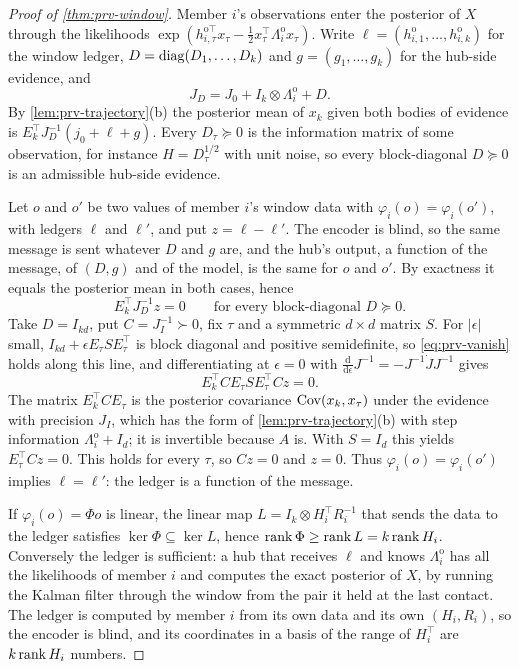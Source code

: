 \begin{proof}[Proof of \cref{thm:prv-window}]
Member $i$'s observations enter the posterior of $X$ through the likelihoods $\exp(h^{\mathrm o\top}_{i,\tau}x_\tau-\frac12x_\tau^\top\Lambda^{\mathrm o}_ix_\tau)$. Write $\ell=(h^{\mathrm o}_{i,1},\dots,h^{\mathrm o}_{i,k})$ for the window ledger, $D=\operatorname{diag}(D_1,\dots,D_k)$ and $g=(g_1,\dots,g_k)$ for the hub-side evidence, and
\[
J_D=J_0+I_k\otimes\Lambda^{\mathrm o}_i+D .
\]
By \cref{lem:prv-trajectory}(b) the posterior mean of $x_k$ given both bodies of evidence is $E_k^\top J_D^{-1}(j_0+\ell+g)$. Every $D_\tau\succeq0$ is the information matrix of some observation, for instance $H=D_\tau^{1/2}$ with unit noise, so every block-diagonal $D\succeq0$ is an admissible hub-side evidence.

Let $o$ and $o'$ be two values of member $i$'s window data with $\varphi_i(o)=\varphi_i(o')$, with ledgers $\ell$ and $\ell'$, and put $z=\ell-\ell'$. The encoder is blind, so the same message is sent whatever $D$ and $g$ are, and the hub's output, a function of the message, of $(D,g)$ and of the model, is the same for $o$ and $o'$. By exactness it equals the posterior mean in both cases, hence
\begin{equation}\label{eq:prv-vanish}
E_k^\top J_D^{-1}z=0\qquad\text{for every block-diagonal }D\succeq0 .
\end{equation}
Take $D=I_{kd}$, put $C=J_{I}^{-1}\succ0$, fix $\tau$ and a symmetric $d\times d$ matrix $S$. For $\lvert\epsilon\rvert$ small, $I_{kd}+\epsilon E_\tau SE_\tau^\top$ is block diagonal and positive semidefinite, so \eqref{eq:prv-vanish} holds along this line, and differentiating at $\epsilon=0$ with $\frac{\mathrm d}{\mathrm d\epsilon}J^{-1}=-J^{-1}\dot JJ^{-1}$ gives
\[
E_k^\top CE_\tau SE_\tau^\top Cz=0 .
\]
The matrix $E_k^\top CE_\tau$ is the posterior covariance $\operatorname{Cov}(x_k,x_\tau)$ under the evidence with precision $J_I$, which has the form of \cref{lem:prv-trajectory}(b) with step information $\Lambda^{\mathrm o}_i+I_d$; it is invertible because $A$ is. With $S=I_d$ this yields $E_\tau^\top Cz=0$. This holds for every $\tau$, so $Cz=0$ and $z=0$. Thus $\varphi_i(o)=\varphi_i(o')$ implies $\ell=\ell'$: the ledger is a function of the message.

If $\varphi_i(o)=\Phi o$ is linear, the linear map $L=I_k\otimes H_i^\top R_i^{-1}$ that sends the data to the ledger satisfies $\ker\Phi\subseteq\ker L$, hence $\operatorname{rank}\Phi\ge\operatorname{rank} L=k\operatorname{rank} H_i$. Conversely the ledger is sufficient: a hub that receives $\ell$ and knows $\Lambda^{\mathrm o}_i$ has all the likelihoods of member $i$ and computes the exact posterior of $X$, by running the Kalman filter through the window from the pair it held at the last contact. The ledger is computed by member $i$ from its own data and its own $(H_i,R_i)$, so the encoder is blind, and its coordinates in a basis of the range of $H_i^\top$ are $k\operatorname{rank} H_i$ numbers.
\end{proof}

